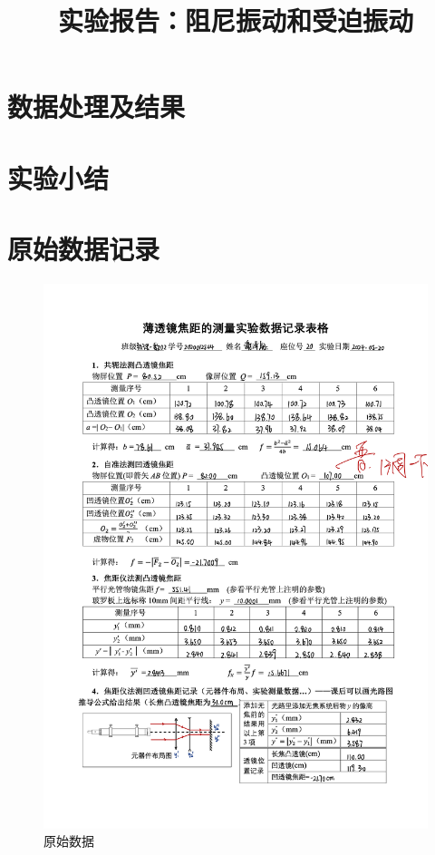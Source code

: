 \documentclass[12pt,a4paper]{amsart}
\title{实验报告：阻尼振动和受迫振动}
\begin{document}
\maketitle

\section{数据处理及结果}

\section{实验小结}

\section{原始数据记录}

\begin{figure}[h]
    \centering
    \includegraphics[width=\linewidth]{img/data.png}
    \caption{原始数据}
    \label{fig:data}
\end{figure}
\end{document}

